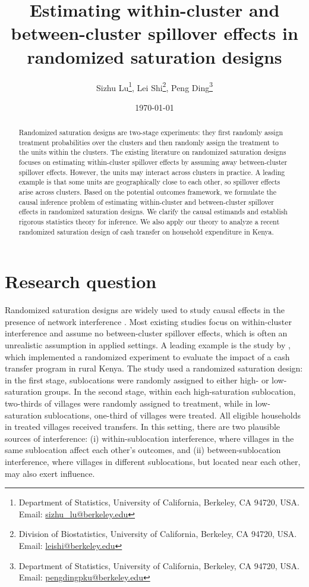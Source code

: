 \documentclass{article}
\title{Estimating within-cluster and between-cluster spillover effects in randomized saturation designs}
\author{ 
Sizhu Lu\thanks{Department of Statistics, University of California, Berkeley, CA 94720, USA. Email: \href{mailto:sizhu_lu@berkeley.edu}{sizhu\_lu@berkeley.edu}}, 
Lei Shi\thanks{Division of Biostatistics, University of California, Berkeley, CA 94720, USA. Email: \href{mailto:leishi@berkeley.edu}{leishi@berkeley.edu}}, 
Peng Ding\thanks{Department of Statistics, University of California, Berkeley, CA 94720, USA. Email: \href{mailto:pengdingpku@berkeley.edu}{pengdingpku@berkeley.edu}}
}
\date{\today}
\begin{document}
\maketitle
\begin{abstract}
    Randomized saturation designs are two-stage experiments: they first randomly assign treatment probabilities over the clusters and then randomly assign the treatment to the units within the clusters. The existing literature on randomized saturation designs focuses on estimating within-cluster spillover effects by assuming away between-cluster spillover effects. However, the units may interact across clusters in practice. A leading example is that some units are geographically close to each other, so spillover effects arise across clusters. Based on the potential outcomes framework, we formulate the causal inference problem of estimating within-cluster and between-cluster spillover effects in randomized saturation designs. We clarify the causal estimands and establish rigorous statistics theory for inference. We also apply our theory to analyze a recent randomized saturation design of cash transfer on household expenditure in Kenya.
\end{abstract}


\section{Research question}
Randomized saturation designs are widely used to study causal effects in the presence of network interference \citep{hudgens2008toward}. Most existing studies focus on within-cluster interference and assume no between-cluster spillover effects, which is often an unrealistic assumption in applied settings. A leading example is the study by \citet{egger2022general}, which implemented a randomized experiment to evaluate the impact of a cash transfer program in rural Kenya. The study used a randomized saturation design: in the first stage, sublocations were randomly assigned to either high- or low-saturation groups. In the second stage, within each high-saturation sublocation, two-thirds of villages were randomly assigned to treatment, while in low-saturation sublocations, one-third of villages were treated. All eligible households in treated villages received transfers. In this setting, there are two plausible sources of interference: (i) within-sublocation interference, where villages in the same sublocation affect each other’s outcomes, and (ii) between-sublocation interference, where villages in different sublocations, but located near each other, may also exert influence.
\end{document}
